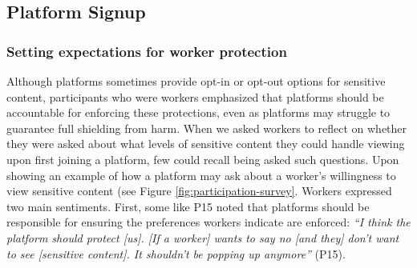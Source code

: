 

\subsection{Platform Signup}
\subsubsection{Setting expectations for worker protection}
Although platforms sometimes provide opt-in or opt-out options for sensitive content, participants who were workers emphasized that platforms should be accountable for enforcing these protections, even as platforms may struggle to guarantee full shielding from harm. When we asked workers to reflect on whether they were asked about what levels of sensitive content they could handle viewing upon first joining a platform, few could recall being asked such questions. Upon showing an example of how a platform may ask about a worker's willingness to view sensitive content (see Figure \ref{fig:participation-survey}. Workers expressed two main sentiments. First, some like P15 noted that platforms should be responsible for ensuring the preferences workers indicate are enforced: \textit{``I think the platform should protect [us]. [If a worker] wants to say no [and they] don't want to see [sensitive content]. It shouldn't be popping up anymore''} (P15). 

